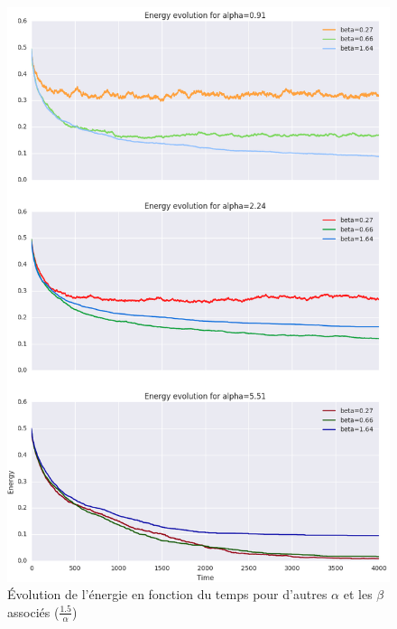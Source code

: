 \documentclass[twocolumn]{article}
\begin{document}
\begin{figure}[!h]
	\includegraphics[width=\columnwidth]{../tobekept/ex1_4826864907612068410-r.png}
	\caption{Évolution de l'énergie en fonction du temps pour d'autres $\alpha$ et les $\beta$ associés ($\frac{1.5}{\alpha}$)}
\end{figure}
\clearpage
\end{document}
